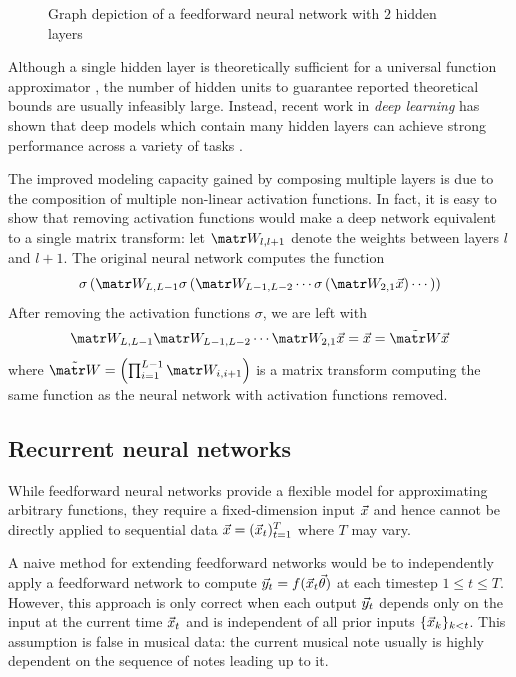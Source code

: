 \begin{figure}[htpb]
    \centering
    
    \caption{Graph depiction of a feedforward neural network with $2$ hidden layers}
    \label{fig:nn-ffw}
\end{figure}

Although a single hidden layer is theoretically sufficient for a universal
function approximator \citep{Cybenko1993}, the number of hidden units to
guarantee reported theoretical bounds are usually infeasibly large. Instead,
recent work in \emph{deep learning} has shown that deep models which contain
many hidden layers can achieve strong performance across a variety of
tasks \citep{Bengio2011}.

The improved modeling capacity gained by composing multiple layers is due to
the composition of multiple non-linear activation functions.
In fact, it is easy to show that removing activation functions would make
a deep network equivalent to a single matrix transform: let $\W_{l,l+1}$
denote the weights between layers $l$ and $l+1$. The original neural network
computes the function
\begin{equation}
    \sigma\left(
        \W_{L,L-1} \sigma \left(
            \W_{L-1,L-2}\cdots \sigma \left(
                \W_{2,1} \x
            \right) \cdots
        \right)
    \right)
\end{equation}
After removing the activation functions $\sigma$, we are left with
\begin{equation}
    \W_{L,L-1} \W_{L-1,L-2}\cdots \W_{2,1} \x
    = \x
    = \tilde{\W} \x
\end{equation}
where $\tilde{\W} = \left(\prod_{i=1}^{L-1} \W_{i,i+1} \right)$
is a matrix transform computing the same function as the neural network with
activation functions removed.

\subsection{Recurrent neural networks}


While feedforward neural networks provide a flexible model for approximating
arbitrary functions, they require a fixed-dimension input $\vec{x}$ and hence
cannot be directly applied to sequential data $\vec{x} = (\vec{x}_t)_{t=1}^T$ where $T$ may
vary.

A naive method for extending feedforward networks would be to independently
apply a feedforward network to compute $\vec{y}_t = f(\vec{x}_t \vec{\theta})$ at each timestep
$1 \leq t \leq T$. However, this approach is only correct when each output
$\vec{y}_t$ depends only on the input at the current time $\vec{x}_t$ and is independent of
all prior inputs $\{\vec{x}_k\}_{k < t}$. This assumption is false in musical data:
the current musical note usually is highly dependent on the sequence of notes
leading up to it.

